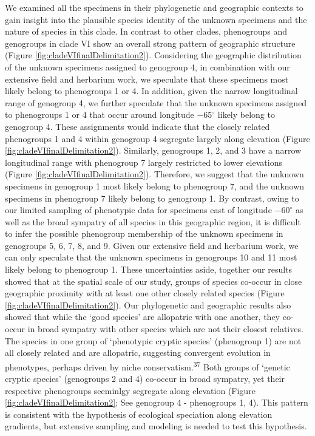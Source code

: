 \documentclass[
  11pt,
]{article}
\begin{document}
We examined all the specimens in their phylogenetic and geographic contexts to gain insight into the plausible species identity of the unknown specimens and the nature of species in this clade. In contrast to other clades, phenogroups and genogroups in clade VI show an overall strong pattern of geographic structure (Figure \ref{fig:cladeVIfinalDelimitation2}). Considering the geographic distribution of the unknown specimens assigned to genogroup 4, in combination with our extensive field and herbarium work, we speculate that these specimens most likely belong to phenogroups 1 or 4. In addition, given the narrow longitudinal range of genogroup 4, we further speculate that the unknown specimens assigned to phenogroups 1 or 4 that occur around longitude \(-65^\circ\) likely belong to genogroup 4. These assignments would indicate that the closely related phenogroups 1 and 4 within genogroup 4 segregate largely along elevation (Figure \ref{fig:cladeVIfinalDelimitation2}). Similarly, genogroups 1, 2, and 3 have a narrow longitudinal range with phenogroup 7 largely restricted to lower elevations (Figure \ref{fig:cladeVIfinalDelimitation2}). Therefore, we suggest that the unknown specimens in genogroup 1 most likely belong to phenogroup 7, and the unknown specimens in phenogroup 7 likely belong to genogroup 1. By contrast, owing to our limited sampling of phenotypic data for specimens east of longitude \(-60^\circ\) as well as the broad sympatry of all species in this geographic region, it is difficult to infer the possible phenogroup membership of the unknown specimens in genogroups 5, 6, 7, 8, and 9. Given our extensive field and herbarium work, we can only speculate that the unknown specimens in genogroups 10 and 11 most likely belong to phenogroup 1. These uncertainties aside, together our results showed that at the spatial scale of our study, groups of species co-occur in close geographic proximity with at least one other closely related species (Figure \ref{fig:cladeVIfinalDelimitation2}). Our phylogenetic and geographic results also showed that while the `good species' are allopatric with one another, they co-occur in broad sympatry with other species which are not their closest relatives. The species in one group of `phenotypic cryptic species' (phenogroup 1) are not all closely related and are allopatric, suggesting convergent evolution in phenotypes, perhaps driven by niche conservatism.\textsuperscript{37} Both groups of `genetic cryptic species' (genogroups 2 and 4) co-occur in broad sympatry, yet their respective phenogroups seeminlgy segregate along elevation (Figure \ref{fig:cladeVIfinalDelimitation2}; See genogroup 4 - phenogroups 1, 4). This pattern is consistent with the hypothesis of ecological speciation along elevation gradients, but extensive sampling and modeling is needed to test this hypothesis.
\end{document}
